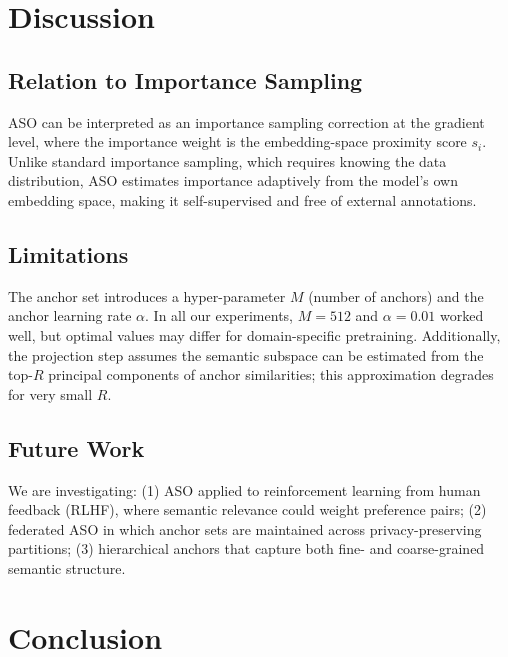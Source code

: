 \documentclass[11pt,a4paper]{article}
\begin{document}
\section{Discussion}
\label{sec:discussion}

\subsection{Relation to Importance Sampling}

ASO can be interpreted as an importance sampling correction at the gradient level,
where the importance weight is the embedding-space proximity score $s_i$. Unlike
standard importance sampling, which requires knowing the data distribution, ASO
estimates importance adaptively from the model's own embedding space, making it
self-supervised and free of external annotations.

\subsection{Limitations}

The anchor set introduces a hyper-parameter $M$ (number of anchors) and the anchor
learning rate $\alpha$. In all our experiments, $M = 512$ and $\alpha = 0.01$ worked
well, but optimal values may differ for domain-specific pretraining. Additionally,
the projection step assumes the semantic subspace can be estimated from the top-$R$
principal components of anchor similarities; this approximation degrades for very small
$R$.

\subsection{Future Work}

We are investigating: (1) ASO applied to reinforcement learning from human feedback
(RLHF), where semantic relevance could weight preference pairs; (2) federated ASO
in which anchor sets are maintained across privacy-preserving partitions; (3)
hierarchical anchors that capture both fine- and coarse-grained semantic structure.

\section{Conclusion}
\label{sec:conclusion}
\end{document}
